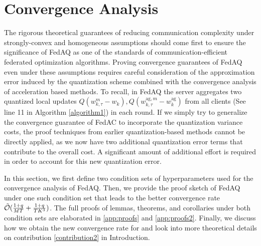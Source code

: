 \documentclass[11pt]{article}
\begin{document}
\section{Convergence Analysis}
\label{convergence_analysis}

The rigorous theoretical guarantees of reducing communication complexity under strongly-convex and homogeneous assumptions should come first to ensure the significance of FedAQ as one of the standards of communication-efficient federated optimization algorithms. Proving convergence guarantees of FedAQ even under these assumptions requires careful consideration of the approximation error induced by the quantization scheme combined with the convergence analysis of acceleration based methods.
To recall, in FedAQ the server aggregates two quantized local updates $Q(w_{k, \tau}^m - w_k), Q(w_{k, \tau}^{\textrm{ag}, m} - w_k^{\textrm{ag}})$ from all clients (See line 11 in Algorithm \ref{algorithm1}) in each round. If we simply try to generalize the convergence guarantee of FedAC to incorporate the quantization variance costs, the proof techniques from earlier quantization-based methods cannot be directly applied, as we now have two additional quantization error terms that contribute to the overall cost. A significant amount of additional effort is required in order to account for this new quantization error. %

In this section, we first define two condition sets of hyperparameters used for the convergence analysis of FedAQ. Then, we provide the proof sketch of FedAQ under one such condition set that leads to the better convergence rate $\Tilde{\mathcal{O}}(\frac{1+q}{MT}+\frac{1+q}{TK^3})$. The full proofs of lemmas, theorems, and corollaries under both condition sets are elaborated in \cref{app:proofs} and \cref{app:proofs2}. Finally, we discuss how we obtain the new convergence rate for \cite{Yeojoon-haddadpour2021federated} and look into more theoretical details on contribution \ref{contribution2} in Introduction.  %
\end{document}
